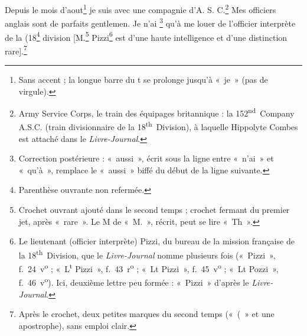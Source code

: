 \begin{LJlettre}
[p.~2]\par\nopagebreak[4]

Depuis le mois d'aout\footnote{Sans accent ; la longue barre du t se prolonge jusqu'à «~je~» (pas de virgule).} je suis avec une compagnie d'A. S. C.\footnote{\label{n:asc}Army Service Corps, le train des équipages britannique : la 152\textsuperscript{nd}~Company A.S.C. (train divisionnaire de la 18\textsuperscript{th}~Division), à laquelle Hippolyte Combes est attaché dans le \textit{Livre-Journal}.} Mes officiers anglais sont de parfaits gentlemen. Je n'ai \footnote{Correction postérieure : «~aussi~», écrit sous la ligne entre «~n'ai~» et «~qu'à~», remplace le «~aussi~» biffé du début de la ligne suivante.} qu'à me louer  de l'officier interprète de la (18\footnote{Parenthèse ouvrante non refermée.} division [M.\footnote{Crochet ouvrant ajouté dans le second temps ; crochet fermant du premier jet, après «~rare~». Le M de «~M.~», récrit, peut se lire «~Th~».} Pizzi\footnote{Le lieutenant (officier interprète) Pizzi, du bureau de la mission française de la 18\textsuperscript{th}~Division, que le \textit{Livre-Journal} nomme plusieurs fois («~Pizzi~», f.~24~v\textsuperscript{o} ; «~L\textsuperscript{t} Pizzi~», f.~43~r\textsuperscript{o} ; «~Lt Pizzi~», f.~45~v\textsuperscript{o} ; «~Lt Pozzi~», f.~46~v\textsuperscript{o}). Ici, deuxième lettre peu formée : «~Pizzi~» d'après le \textit{Livre-Journal}.} est d'une haute intelligence et d'une distinction rare].\footnote{Après le crochet, deux petites marques du second temps («~(~» et une apostrophe), sans emploi clair.}


\end{LJlettre}
